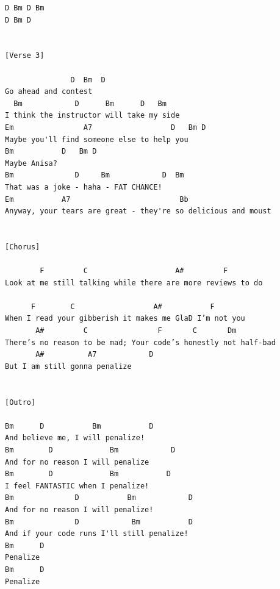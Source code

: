 \documentclass{article}
\begin{document}
\begin{verbatim}
D Bm D Bm
D Bm D


[Verse 3]

               D  Bm  D
Go ahead and contest
  Bm            D      Bm      D   Bm
I think the instructor will take my side
Em                A7                  D   Bm D
Maybe you'll find someone else to help you
Bm           D   Bm D
Maybe Anisa?
Bm              D     Bm            D  Bm
That was a joke - haha - FAT CHANCE!
Em           A7                         Bb
Anyway, your tears are great - they're so delicious and moust


[Chorus]

        F         C                    A#         F
Look at me still talking while there are more reviews to do

      F        C                  A#           F
When I read your gibberish it makes me GlaD I’m not you
       A#         C                F       C       Dm
There’s no reason to be mad; Your code’s honestly not half-bad
       A#          A7            D
But I am still gonna penalize


[Outro]

Bm      D           Bm           D
And believe me, I will penalize!
Bm        D             Bm            D
And for no reason I will penalize
Bm        D             Bm           D
I feel FANTASTIC when I penalize!
Bm              D           Bm            D
And for no reason I will penalize!
Bm              D            Bm           D
And if your code runs I'll still penalize!
Bm      D
Penalize
Bm      D 
Penalize
\end{verbatim}

\printbibliography
\end{document}
